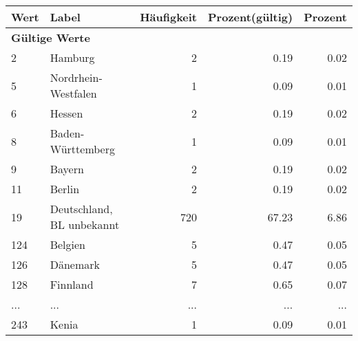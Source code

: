      \begin{longtable}{lXrrr}
     \toprule
     \textbf{Wert} & \textbf{Label} & \textbf{Häufigkeit} & \textbf{Prozent(gültig)} & \textbf{Prozent} \\
     \endhead
     \midrule
     \multicolumn{5}{l}{\textbf{Gültige Werte}}\\
        2 & \multicolumn{1}{X}{Hamburg} & %
          \num{2} &
          \num[round-mode=places,round-precision=2]{0,19} &
          \num[round-mode=places,round-precision=2]{0,02} \\
        5 & \multicolumn{1}{X}{Nordrhein-Westfalen} & %
          \num{1} &
          \num[round-mode=places,round-precision=2]{0,09} &
          \num[round-mode=places,round-precision=2]{0,01} \\
        6 & \multicolumn{1}{X}{Hessen} & %
          \num{2} &
          \num[round-mode=places,round-precision=2]{0,19} &
          \num[round-mode=places,round-precision=2]{0,02} \\
        8 & \multicolumn{1}{X}{Baden-Württemberg} & %
          \num{1} &
          \num[round-mode=places,round-precision=2]{0,09} &
          \num[round-mode=places,round-precision=2]{0,01} \\
        9 & \multicolumn{1}{X}{Bayern} & %
          \num{2} &
          \num[round-mode=places,round-precision=2]{0,19} &
          \num[round-mode=places,round-precision=2]{0,02} \\
        11 & \multicolumn{1}{X}{Berlin} & %
          \num{2} &
          \num[round-mode=places,round-precision=2]{0,19} &
          \num[round-mode=places,round-precision=2]{0,02} \\
        19 & \multicolumn{1}{X}{Deutschland, BL unbekannt} & %
          \num{720} &
          \num[round-mode=places,round-precision=2]{67,23} &
          \num[round-mode=places,round-precision=2]{6,86} \\
        124 & \multicolumn{1}{X}{Belgien} & %
          \num{5} &
          \num[round-mode=places,round-precision=2]{0,47} &
          \num[round-mode=places,round-precision=2]{0,05} \\
        126 & \multicolumn{1}{X}{Dänemark} & %
          \num{5} &
          \num[round-mode=places,round-precision=2]{0,47} &
          \num[round-mode=places,round-precision=2]{0,05} \\
        128 & \multicolumn{1}{X}{Finnland} & %
          \num{7} &
          \num[round-mode=places,round-precision=2]{0,65} &
          \num[round-mode=places,round-precision=2]{0,07} \\
       ... & ... & ... & ... & ... \\
        243 & \multicolumn{1}{X}{Kenia} & %
          \num{1} &
          \num[round-mode=places,round-precision=2]{0,09} &
          \num[round-mode=places,round-precision=2]{0,01} \\


\end{longtable}
